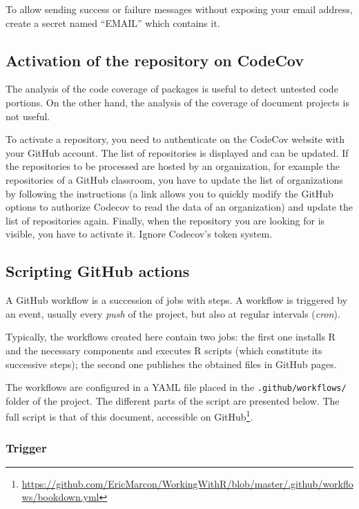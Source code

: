 \documentclass[
  12pt,
  american,
  a4paper,
  extrafontsizes,onecolumn,openright
  ]{memoir}
\begin{document}
To allow sending success or failure messages without exposing your email address, create a secret named \enquote{EMAIL} which contains it.

\subsection{Activation of the repository on CodeCov}\label{activation-of-the-repository-on-codecov}

The analysis of the code coverage of packages is useful to detect untested code portions.
On the other hand, the analysis of the coverage of document projects is not useful.

To activate a repository, you need to authenticate on the CodeCov website with your GitHub account.
The list of repositories is displayed and can be updated.
If the repositories to be processed are hosted by an organization, for example the repositories of a GitHub classroom, you have to update the list of organizations by following the instructions (a link allows you to quickly modify the GitHub options to authorize Codecov to read the data of an organization) and update the list of repositories again.
Finally, when the repository you are looking for is visible, you have to activate it.
Ignore Codecov's token system.

\subsection{Scripting GitHub actions}\label{scripting-github-actions}

A GitHub workflow is a succession of jobs with steps.
A workflow is triggered by an event, usually every \emph{push} of the project, but also at regular intervals (\emph{cron}).

Typically, the workflows created here contain two jobs: the first one installs R and the necessary components and executes R scripts (which constitute its successive steps); the second one publishes the obtained files in GitHub pages.

The workflows are configured in a YAML file placed in the \texttt{.github/workflows/} folder of the project.
The different parts of the script are presented below.
The full script is that of this document, accessible on GitHub\footnote{\url{https://github.com/EricMarcon/WorkingWithR/blob/master/.github/workflows/bookdown.yml}}.

\subsubsection{Trigger}\label{sec:declenchement}
\end{document}

